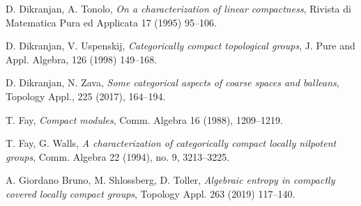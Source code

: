 \documentclass[12pt]{article}
\theoremstyle{definition}
\numberwithin{equation}{section}
\begin{document}
\begin{thebibliography}{999}
{ D. Dikranjan, A. Tonolo, {\it On a characterization of linear compactness}, Rivista di Matematica Pura ed Applicata {17} (1995) 95--106.  

 D. Dikranjan, V. Uspenskij, {\it Categorically compact  topological groups}, J. Pure and Appl. Algebra, {126} (1998) 149--168.  

 {D. Dikranjan, N. Zava}, {\em Some categorical aspects of coarse spaces and balleans}, Topology Appl., 225 (2017), 164--194.

 T. Fay, {\em Compact modules}, Comm. Algebra 16 (1988), 1209--1219. 

 T. Fay, G. Walls, {\em A characterization of categorically compact locally nilpotent groups}, 
Comm. Algebra 22 (1994), no. 9, 3213--3225.


%







 {A. Giordano Bruno, M. Shlossberg, D. Toller}, \textit{Algebraic entropy in compactly covered locally compact groups}, Topology Appl. 263 (2019) 117--140.

}
\end{thebibliography}
\end{document}
